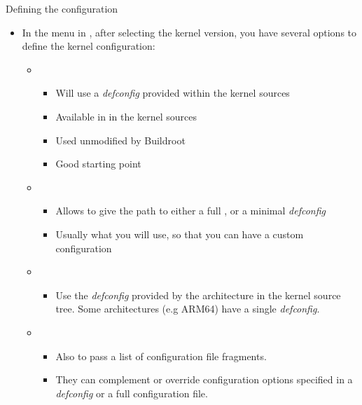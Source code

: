 \begin{frame}{Defining the configuration}
  \begin{itemize}
  \item In the  menu in , after
    selecting the kernel version, you have several options to define the
    kernel configuration:
    \begin{itemize}
    \item {}
      \begin{itemize}
      \item Will use a {\em defconfig} provided within the kernel
        sources
      \item Available in  in the kernel
        sources
      \item Used unmodified by Buildroot
      \item Good starting point
      \end{itemize}
    \item {}
      \begin{itemize}
      \item Allows to give the path to either a full ,
        or a minimal {\em defconfig}
      \item Usually what you will use, so that you can have a custom
        configuration
      \end{itemize}
    \item {}
      \begin{itemize}
      \item Use the {\em defconfig} provided by the architecture in
        the kernel source tree. Some architectures (e.g ARM64) have a
        single {\em defconfig}.
      \end{itemize}
    \item {}
      \begin{itemize}
      \item Also to pass a list of configuration file fragments.
      \item They can complement or override configuration options
        specified in a {\em defconfig} or a full configuration file.
      \end{itemize}
    \end{itemize}
  \end{itemize}
\end{frame}

